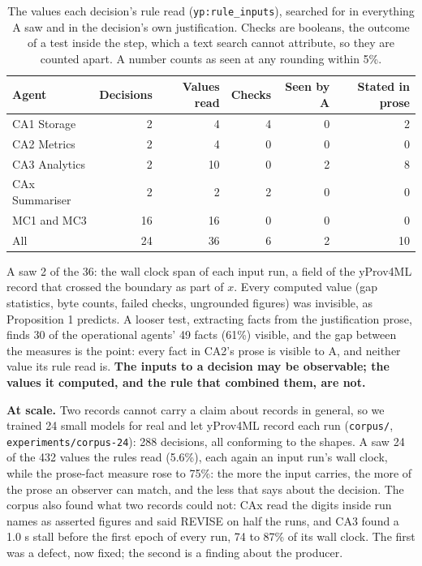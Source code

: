 \documentclass[conference]{IEEEtran}
\begin{document}
\begin{table}[t]
\centering\footnotesize
\caption{The values each decision's rule read (\texttt{yp:\allowbreak{}rule\_\allowbreak{}inputs}), searched for in everything A saw and in the decision's own justification. Checks are booleans, the outcome of a test inside the step, which a text search cannot attribute, so they are counted apart. A number counts as seen at any rounding within 5\%.}\label{tab:3}
\begin{tabularx}{\columnwidth}{Lrrrrr}
\toprule
Agent & Decisions & Values read & Checks & Seen by A & Stated in prose \\
\midrule
CA1 Storage & 2 & 4 & 4 & 0 & 2 \\
CA2 Metrics & 2 & 4 & 0 & 0 & 0 \\
CA3 Analytics & 2 & 10 & 0 & 2 & 8 \\
CAx Summariser & 2 & 2 & 2 & 0 & 0 \\
MC1 and MC3 & 16 & 16 & 0 & 0 & 0 \\
All & 24 & 36 & 6 & 2 & 10 \\
\bottomrule
\end{tabularx}
\end{table}

\noindent A saw 2 of the 36: the wall clock span of each input run, a field of the yProv4ML record that crossed the boundary as part of $x$. Every computed value (gap statistics, byte counts, failed checks, ungrounded figures) was invisible, as Proposition 1 predicts. A looser test, extracting facts from the justification prose, finds 30 of the operational agents' 49 facts (61\%) visible, and the gap between the measures is the point: every fact in CA2's prose is visible to A, and neither value its rule read is. \textbf{The inputs to a decision may be observable; the values it computed, and the rule that combined them, are not.}

\noindent \textbf{At scale.} Two records cannot carry a claim about records in general, so we trained 24 small models for real and let yProv4ML record each run (\texttt{corpus/\allowbreak{}}, \texttt{experiments/\allowbreak{}corpus-24}): 288 decisions, all conforming to the shapes. A saw 24 of the 432 values the rules read (5.6\%), each again an input run's wall clock, while the prose-fact measure rose to 75\%: the more the input carries, the more of the prose an observer can match, and the less that says about the decision. The corpus also found what two records could not: CAx read the digits inside run names as asserted figures and said REVISE on half the runs, and CA3 found a 1.0 s stall before the first epoch of every run, 74 to 87\% of its wall clock. The first was a defect, now fixed; the second is a finding about the producer.
\end{document}
